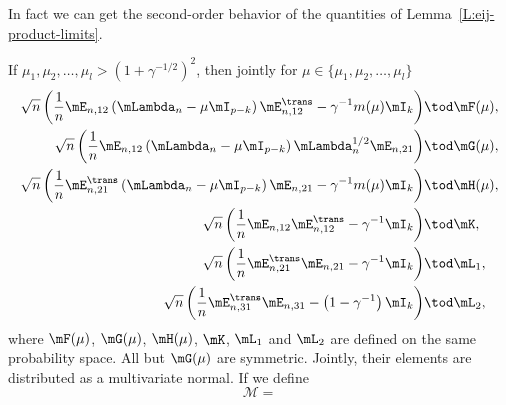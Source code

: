 In fact we can get the second-order behavior of the quantities of Lemma~\ref{L:eij-product-limits}.

\begin{lemma}\label{L:eij-product-scaled-limits}
    If $\mu_1, \mu_2, \ldots, \mu_l > \left( 1 + \gamma^{-1/2} \right)^2$, 
    then jointly for $\mu \in \{ \mu_1, \mu_2, \ldots, \mu_l \}$
    \begin{align*}
        \sqrt{n}
        \left(
            \frac{1}{n}
            \mE_{n,12}
            \left(
                \mLambda_n
                -
                \mu
                \mI_{p-k}
            \right)
            \mE_{n,12}^\trans
            -
            \gamma^{-1}
            m(\mu)
            \mI_k
        \right)
            &\tod \mF(\mu), \\
        \sqrt{n}
        \left(
            \frac{1}{n}
            \mE_{n,12}
            \left(
                \mLambda_n
                -
                \mu
                \mI_{p-k}
            \right)
            \mLambda_{n}^{1/2}
            \mE_{n,21}
        \right)
            &\tod \mG(\mu), \\
        \sqrt{n}
        \left(
            \frac{1}{n}
            \mE_{n,21}^\trans
            \left(
                \mLambda_n
                -
                \mu
                \mI_{p-k}
            \right)
            \mE_{n,21}
            -
            \gamma^{-1}
            m(\mu)
            \mI_k
        \right)
            &\tod \mH(\mu), \\
        \sqrt{n}
        \left(
            \frac{1}{n}
            \mE_{n,12} \mE_{n,12}^\trans
            -
            \gamma^{-1}
            \mI_k
        \right)
            &\tod \mK, \\
        \sqrt{n}
        \left(
            \frac{1}{n}
            \mE_{n,21}^\trans \mE_{n,21}
            -
            \gamma^{-1}
            \mI_k
        \right)
            &\tod \mL_1, \\
        \sqrt{n}
        \left(
            \frac{1}{n}
            \mE_{n,31}^\trans \mE_{n,31}
            -
            \left( 1 - \gamma^{-1} \right)
            \mI_k
        \right)
            &\tod \mL_2,
    \end{align*}
    where $\mF(\mu)$, $\mG(\mu)$, $\mH(\mu)$, $\mK$, $\mL_1$ and $\mL_2$ are 
    defined on the same probability space.  
    All but $\mG(\mu)$ are symmetric. Jointly, their elements are
    distributed as a multivariate normal.  If we define
    \[
        \mathcal{M}
        =
\]
\end{lemma}
